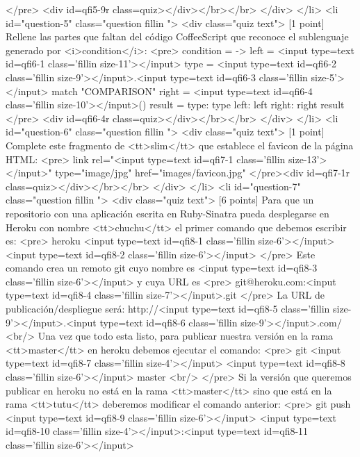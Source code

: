 \begin{rawhtml}
{</pre>
<div id=qfi5-9r class=quiz></div></br></br>      </div>
    </li>
    <li id="question-5" class="question fillin ">
      <div class="quiz text">
[1 point] Rellene las partes que faltan del código CoffeeScript
que reconoce el sublenguaje generado por <i>condition</i>:
  <pre>
  condition = ->
    left = <input type=text id=qfi6-1 class='fillin size-11'></input>
    type = <input type=text id=qfi6-2 class='fillin size-9'></input>.<input type=text id=qfi6-3 class='fillin size-5'></input>
    match "COMPARISON"
    right = <input type=text id=qfi6-4 class='fillin size-10'></input>()
    result =
      type: type
      left: left
      right: right
    result
  </pre>
<div id=qfi6-4r class=quiz></div></br></br>      </div>
    </li>
    <li id="question-6" class="question fillin ">
      <div class="quiz text">
[1 point] 
Complete este fragmento de <tt>slim</tt> que establece el favicon de 
la página HTML:
<pre>
    link rel="<input type=text id=qfi7-1 class='fillin size-13'></input>" type="image/jpg" href="images/favicon.jpg"
</pre><div id=qfi7-1r class=quiz></div></br></br>      </div>
    </li>
    <li id="question-7" class="question fillin ">
      <div class="quiz text">
[6 points] 
      Para que un repositorio con una aplicación escrita en Ruby-Sinatra
      pueda desplegarse en Heroku con nombre <tt>chuchu</tt> el primer comando   que debemos escribir es:
      <pre>
      heroku <input type=text id=qfi8-1 class='fillin size-6'></input> <input type=text id=qfi8-2 class='fillin size-6'></input>
      </pre>
      Este comando crea un remoto git cuyo nombre es <input type=text id=qfi8-3 class='fillin size-6'></input>
      y cuya URL es 
      <pre>
        git@heroku.com:<input type=text id=qfi8-4 class='fillin size-7'></input>.git
      </pre>
      La URL de publicación/despliegue será:
      http://<input type=text id=qfi8-5 class='fillin size-9'></input>.<input type=text id=qfi8-6 class='fillin size-9'></input>.com/
      <br/>
      Una vez que todo esta listo, para publicar nuestra versión
      en la rama <tt>master</tt> en heroku debemos ejecutar el comando:
      <pre>
      git <input type=text id=qfi8-7 class='fillin size-4'></input> <input type=text id=qfi8-8 class='fillin size-6'></input> master
      <br/>
      </pre>
      Si la versión que queremos publicar en heroku no está en la rama
      <tt>master</tt> sino que está en la rama <tt>tutu</tt> deberemos 
      modificar el comando anterior:
      <pre>
      git push <input type=text id=qfi8-9 class='fillin size-6'></input> <input type=text id=qfi8-10 class='fillin size-4'></input>:<input type=text id=qfi8-11 class='fillin size-6'></input>
}
\end{rawhtml}
